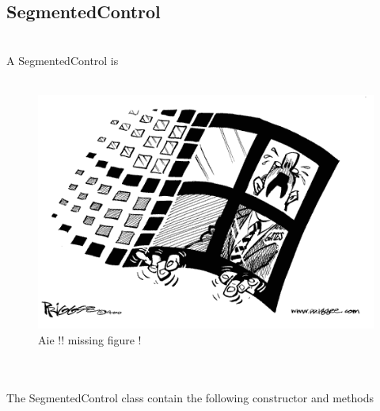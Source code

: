 \documentclass[a4paper,11pt]{extarticle}
\begin{document}
\newpage
\subsection{SegmentedControl}

~\\ A SegmentedControl is 
~\\
~\\

\begin{figure}[htbp]
   \centering
   \includegraphics[scale=0.55]{AWFig.png} 
   \caption{Aie !! missing figure !}
   \label{fig:11}
\end{figure}

~\\

~\\ The SegmentedControl class contain the following constructor and methods
\end{document}
